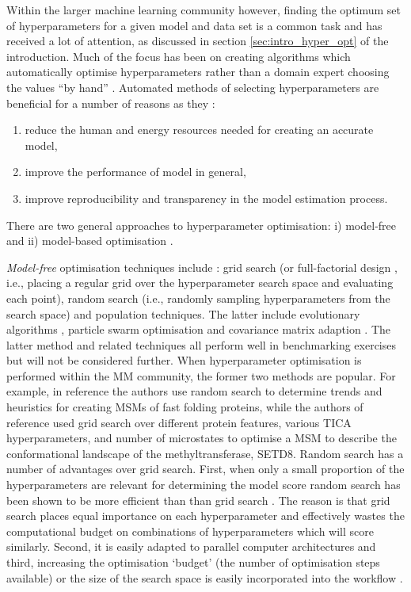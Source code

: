 Within the larger machine learning community however, finding the optimum set of hyperparameters for a given model and data set is a common task and has received a lot of attention, as discussed in section \ref{sec:intro_hyper_opt} of the introduction. Much of the focus has been on creating algorithms which automatically optimise hyperparameters rather than a domain expert choosing the values ``by hand'' \cite{feurer2019hyperparameter}.  Automated methods of selecting hyperparameters are beneficial for a number of reasons as they \cite{feurer2019hyperparameter}:
\begin{enumerate}
    \item reduce the human and energy resources needed for creating an accurate model,
    \item improve the performance of model in general,
    \item improve reproducibility and transparency in the model estimation process. 
\end{enumerate}
There are two general approaches to hyperparameter optimisation: i) model-free and ii) model-based optimisation \cite{feurer2019hyperparameter}. 

\emph{Model-free} optimisation techniques include \cite{feurer2019hyperparameter}: grid search (or full-factorial design \cite{c1997montgomery}, i.e., placing a regular grid over the hyperparameter search space and evaluating each point), random search (i.e., randomly sampling hyperparameters from the search space)  and population techniques. The latter include evolutionary algorithms \cite{simon2013evolutionary},  particle swarm optimisation \cite{kennedyParticleSwarmOptimization1995,eberhart1998comparison} and covariance matrix adaption \cite{hansenCMAEvolutionStrategy2016}. The latter method and related techniques all perform well in benchmarking exercises \cite{dufosse2019benchmarking,faury2019benchmarking,bodner2019benchmarking} but will not be considered further. When hyperparameter optimisation is performed within the MM community, the former two methods are popular. For example, in reference \cite{husicOptimizedParameterSelection2016} the authors use random search to determine trends and heuristics for creating MSMs of fast folding proteins, while the authors of reference \cite{chenDynamicConformationalLandscape2019} used grid search over different protein features, various TICA hyperparameters, and number of microstates to optimise a MSM to describe the conformational landscape of the methyltransferase, SETD8. Random search has a number of advantages over grid search. First, when only a small proportion of the hyperparameters are relevant for determining the model score random search has been shown  to be more efficient than  than grid search \cite{bergstrajamesbergstraRandomSearchHyperParameter2012}. The reason is that grid search places equal importance on each hyperparameter and effectively wastes the computational budget on combinations of hyperparameters which will score similarly. Second, it is easily adapted to parallel computer architectures and third, increasing the optimisation `budget' (the number of optimisation steps available) or the size of the search space is easily incorporated into the workflow \cite{feurer2019hyperparameter}.

